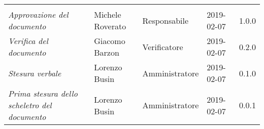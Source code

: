 \newpage 
\section*{}
\begin{table}[H]
	\centering
	\begin{tabular}{p{4cm}|C{3cm}|C{3cm}|R{2.5cm}|R{2cm}}
		
		 & & & & \\
		
		
		\emph{Approvazione del documento} & Michele Roverato & Responsabile & 2019-02-07 & 1.0.0 \\
		\hline
		
		\emph{Verifica del documento} & Giacomo Barzon & Verificatore & 2019-02-07 & 0.2.0 \\
		\hline

		\emph{Stesura verbale} & Lorenzo Busin & Amministratore & 2019-02-07 & 0.1.0 \\
		\hline
		
		\emph{Prima stesura dello scheletro del documento} & Lorenzo Busin & Amministratore & 2019-02-07 & 0.0.1 \\
		
	\end{tabular}
	
\end{table}


\clearpage